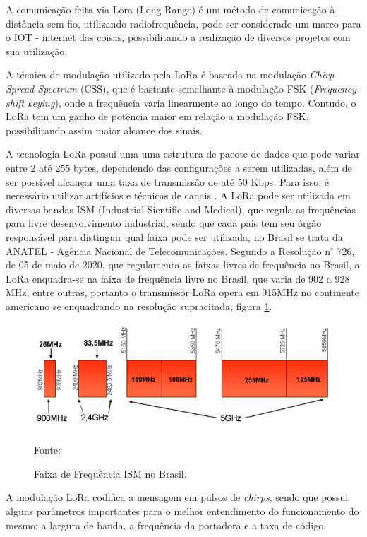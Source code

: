 \par A comunicação feita via Lora (Long Range) é um método de comunicação à distância sem fio, utilizando radiofrequência, pode ser considerado um marco para o IOT - internet das coisas, possibilitando a realização de diversos projetos com sua utilização.
\par A técnica de modulação utilizado pela LoRa é baseada na modulação \textit{Chirp Spread Spectrum} (CSS), que é bastante semelhante à modulação FSK (\textit{Frequency-shift keying}), onde a frequência varia linearmente ao longo do tempo. Contudo, o LoRa tem um ganho de potência maior em relação a modulação FSK, possibilitando assim maior alcance dos sinais.
\par A tecnologia LoRa possui uma uma estrutura de pacote de dados que pode variar entre 2 até 255 bytes, dependendo das configurações a serem utilizadas, além de ser possível alcançar uma taxa de transmissão de até 50 Kbps. Para isso, é necessário  utilizar artifícios e técnicas de canais \cite{transmissaoLoRa}. A LoRa pode ser utilizada em diversas bandas ISM (Industrial Sientific and Medical), que regula as frequências para livre desenvolvimento industrial, sendo que cada país tem seu órgão responsável para distinguir qual faixa pode ser utilizada, no Brasil se trata da ANATEL - Agência Nacional de Telecomunicações. Segundo a Resolução n$^{\circ}$ 726, de 05 de maio de 2020, que regulamenta as faixas livres de frequência no Brasil\cite{resolucao726}, a LoRa enquadra-se na faixa de frequência livre no Brasil, que varia de 902 a 928 MHz, entre outras, portanto o transmissor LoRa opera em 915MHz no continente americano se enquadrando na resolução supracitada, figura \ref{fig:Faixa de Frequência ISM}.

\begin{figure}[!htb]
\centering
\includegraphics[width=\textwidth]{figuras/faixas de frequencia .png}  
\caption{Faixa de Frequência ISM no Brasil.}
{\footnotesize Fonte:\cite{faixafreq}}
\label{fig:Faixa de Frequência ISM} %
\end{figure}
\par A modulação LoRa codifica a mensagem em pulsos de \textit{chirps}, sendo que possui alguns parâmetros importantes para o melhor entendimento do funcionamento do mesmo: a largura de banda, a frequência da portadora e a taxa de código\cite{desepenhoLoRa}.

